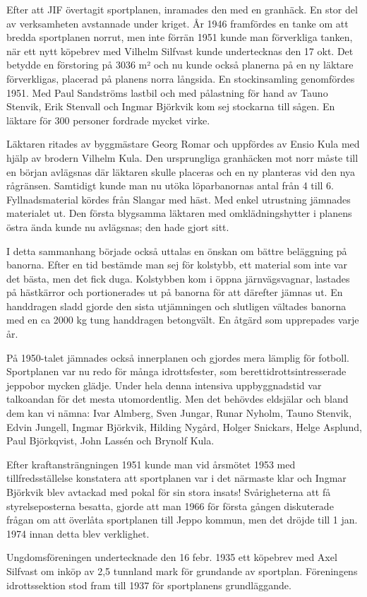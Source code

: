 Efter att JIF övertagit sportplanen, inramades den med en granhäck. En stor del av verksamheten avstannade under kriget. År 1946 framfördes  en tanke om att bredda sportplanen norrut, men inte förrän 1951 kunde man förverkliga tanken, när ett nytt köpebrev med Vilhelm Silfvast kunde undertecknas den 17 okt. Det betydde en förstoring på 3036 m² och nu kunde också planerna på en ny läktare förverkligas, placerad på planens norra långsida. En stockinsamling genomfördes 1951. Med Paul Sandströms lastbil och med pålastning för hand av Tauno Stenvik, Erik Stenvall och Ingmar Björkvik kom sej stockarna till sågen. En läktare för 300 personer fordrade mycket virke.

Läktaren ritades av byggmästare Georg Romar och uppfördes av Ensio Kula med hjälp av brodern Vilhelm Kula. Den ursprungliga granhäcken mot norr måste till en början avlägsnas där läktaren skulle placeras och en ny planteras vid den nya rågränsen. Samtidigt kunde man nu utöka löparbanornas antal från 4 till 6. Fyllnadsmaterial kördes från Slangar med häst. Med enkel utrustning jämnades materialet ut. Den första blygsamma läktaren med omklädningshytter i planens östra ända kunde nu avlägsnas; den hade gjort sitt.

I detta sammanhang började också uttalas en önskan om bättre beläggning på banorna. Efter en tid bestämde man sej för kolstybb, ett material som inte var det bästa, men det fick duga. Kolstybben kom i öppna järnvägsvagnar, lastades på hästkärror och portionerades ut på banorna för att därefter jämnas ut. En handdragen sladd gjorde den sista utjämningen och slutligen vältades banorna med en ca 2000 kg tung handdragen betongvält. En åtgärd som upprepades varje år.

På 1950-talet jämnades också innerplanen och gjordes mera lämplig för fotboll. Sportplanen var nu redo för många idrottsfester, som berettidrottsintresserade jeppobor mycken glädje. Under hela denna intensiva uppbyggnadstid var talkoandan för det mesta utomordentlig. Men det behövdes eldsjälar och bland dem kan vi nämna: Ivar Almberg, Sven Jungar, Runar Nyholm, Tauno Stenvik, Edvin Jungell, Ingmar Björkvik, Hilding Nygård, Holger Snickars, Helge Asplund, Paul Björkqvist, John Lassén och Brynolf Kula.

Efter kraftansträngningen 1951 kunde man vid årsmötet 1953 med tillfredsställelse konstatera att sportplanen var i det närmaste klar och Ingmar Björkvik blev avtackad med pokal för sin stora insats! Svårigheterna att få styrelseposterna besatta, gjorde att man 1966 för första gången diskuterade frågan om att överlåta sportplanen till Jeppo kommun, men det dröjde till 1 jan. 1974 innan detta blev verklighet.


Ungdomsföreningen undertecknade den 16 febr. 1935 ett köpebrev med Axel Silfvast om inköp av 2,5 tunnland mark för grundande av sportplan. Föreningens idrottssektion stod fram till 1937 för sportplanens grundläggande.

